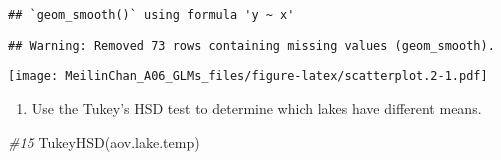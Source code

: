 \documentclass[
]{article}
\newenvironment{Shaded}{\begin{snugshade}}{\end{snugshade}}
\newcommand{\CommentTok}[1]{\textcolor[rgb]{0.56,0.35,0.01}{\textit{#1}}}
\newcommand{\FunctionTok}[1]{\textcolor[rgb]{0.00,0.00,0.00}{#1}}
\newcommand{\NormalTok}[1]{#1}
\providecommand{\tightlist}{%
  \setlength{\itemsep}{0pt}\setlength{\parskip}{0pt}}
\begin{document}
\begin{verbatim}
## `geom_smooth()` using formula 'y ~ x'
\end{verbatim}

\begin{verbatim}
## Warning: Removed 73 rows containing missing values (geom_smooth).
\end{verbatim}

\texttt{[image: MeilinChan\_A06\_GLMs\_files/figure-latex/scatterplot.2-1.pdf]}

\begin{enumerate}
\def\labelenumi{\arabic{enumi}.}
\setcounter{enumi}{14}
\tightlist
\item
  Use the Tukey's HSD test to determine which lakes have different
  means.
\end{enumerate}

\begin{Shaded}
\begin{Highlighting}[]
\CommentTok{\#15}
\FunctionTok{TukeyHSD}\NormalTok{(aov.lake.temp)}
\end{Highlighting}
\end{Shaded}
\end{document}
